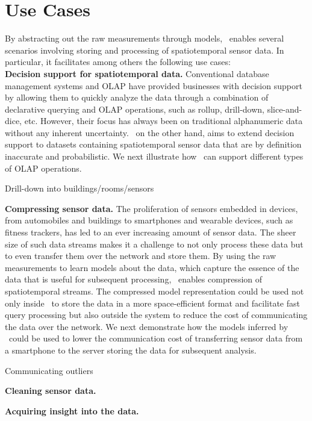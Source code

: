 \section{Use Cases}
\label{sec:usecases}

By abstracting out the raw measurements through models, \projName\ enables several scenarios involving storing and processing of spatiotemporal sensor data. In particular, it facilitates among others the following use cases:\\

{\bf Decision support for spatiotemporal data.} Conventional database management systems and OLAP \cite{olap} have provided businesses with decision support by allowing them to quickly analyze the data through a combination of declarative querying and OLAP operations, such as rollup, drill-down, slice-and-dice, etc. However, their focus has always been on traditional alphanumeric data without any inherent uncertainty. \projName\ on the other hand, aims to extend decision support to datasets containing spatiotemporal sensor data that are by definition inaccurate and probabilistic. We next illustrate how \projName\ can support different types of OLAP operations.

\begin{example}
Drill-down into buildings/rooms/sensors
\end{example}

{\bf Compressing sensor data.} The proliferation of sensors embedded in devices, from automobiles and buildings to smartphones and wearable devices, such as fitness trackers, has led to an ever increasing amount of sensor data. The sheer size of such data streams makes it a challenge to not only process these data but to even transfer them over the network and store them. By using the raw measurements to learn models about the data, which capture the essence of the data that is useful for subsequent processing, \projName\ enables compression of spatiotemporal streams. The compressed model representation could be used not only inside \projName\ to store the data in a more space-efficient format and facilitate fast query processing but also outside the system to reduce the cost of communicating the data over the network. We next demonstrate how the models inferred by \projName\ could be used to lower the communication cost of transferring sensor data from a smartphone to the server storing the data for subsequent analysis.

\begin{example}
Communicating outliers
\end{example}

{\bf Cleaning sensor data.}

{\bf Acquiring insight into the data.}